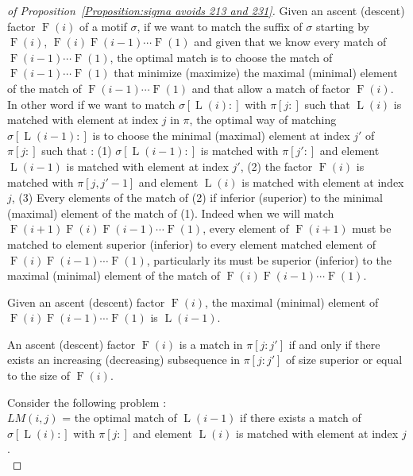 \documentclass[a4paper]{llncs}
\newcommand{\ptext}{\pi}
\newcommand{\pmotif}{\sigma}
\DeclareMathOperator{\firsta}{L}
\newcommand{\first}[1]{\firsta({#1})}
\DeclareMathOperator{\factora}{F}
\newcommand{\factor}[1]{\factora({#1})}
\begin{document}
\begin{proof}[of Proposition~\ref{Proposition:sigma avoids 213 and 231}]
Given an ascent (descent) factor $\factor{i}$ of a motif $\pmotif$, if we want to match the suffix of $\pmotif$ starting by $\factor{i}$, $\factor{i}\factor{i-1}\cdots\factor{1}$ and given that we know every match of $\factor{i-1}\cdots\factor{1}$, the optimal match is to choose the match of $\factor{i-1}\cdots\factor{1}$ that minimize (maximize) the maximal (minimal) element of the match of $\factor{i-1}\cdots\factor{1}$ and that allow a match of factor $\factor{i}$. In other word if we want to match $\pmotif[\first{i}:]$ with $\ptext[j:]$ such that $\first{i}$ is matched with element at index $j$ in $\ptext$, the optimal way of matching $\pmotif[\first{i-1}:]$ is to choose the minimal (maximal) element at index $j'$ of $\ptext[j:]$ such that : (1) $\pmotif[\first{i-1}:]$ is matched with $\ptext[j':]$ and element $\first{i-1}$ is matched with element at index $j'$, (2) the factor $\factor{i}$ is matched with $\ptext[j,j'-1]$ and element $\first{i}$ is matched with element at index $j$, (3) Every elements of the match of (2) if inferior (superior) to the minimal (maximal) element of the match of (1). Indeed when we will match $\factor{i+1}\factor{i}\factor{i-1}\cdots\factor{1}$, every element of $\factor{i+1}$ must be matched to element superior (inferior) to every element matched element of $\factor{i}\factor{i-1}\cdots\factor{1}$, particularly its must be superior (inferior) to the maximal (minimal) element of the match of $\factor{i}\factor{i-1}\cdots\factor{1}$.
		
\begin{remark}
Given an ascent (descent) factor $\factor{i}$, the maximal (minimal) element of $\factor{i}\factor{i-1}\cdots\factor{1}$ is $\first{i-1}$.			  
\end{remark}		

\begin{remark}
An ascent (descent) factor 	$\factor{i}$ is a match in $\ptext[j:j']$  if and only if there exists an increasing (decreasing) subsequence in $\ptext[j:j']$ of size superior or equal to the size of $\factor{i}$.		  
\end{remark}
			
Consider the following problem :\\
$LM(i,j)$ = the optimal match of $\first{i-1}$	
	if there exists a match of $\pmotif[\first{i}:]$ 
	with $\ptext[j:]$
	and element $\first{i}$ 
	is matched with element at index $j$.\\
	

\end{proof}
\end{document}

